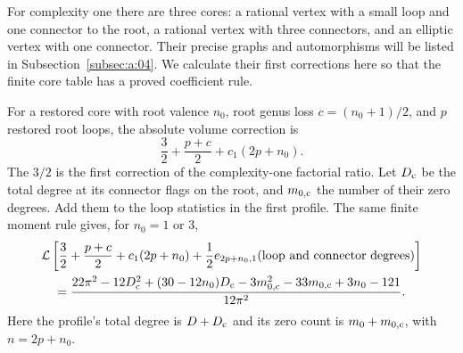 \documentclass[a4paper,10pt]{article}
\numberwithin{equation}{section}
\theoremstyle{paperplain}
\theoremstyle{paperremark}
\theoremstyle{paperplain}
\begin{document}
For complexity one there are three cores: a rational vertex with a
small loop and one connector to the root, a rational vertex with three
connectors, and an elliptic vertex with one connector. Their precise
graphs and automorphisms will be listed in
Subsection~\ref{subsec:a:04}. We calculate their first corrections
here so that the finite core table has a proved coefficient rule.

For a restored core with root valence $n_0$, root genus loss
$c=(n_0+1)/2$, and $p$ restored root loops, the absolute volume
correction is
\[
 \frac32+\frac{p+c}{2}+c_1(2p+n_0).
\]
The $3/2$ is the first correction of the complexity-one factorial
ratio. Let $D_{\rm c}$ be the total degree at its connector flags on
the root, and $m_{0,\rm c}$ the number of their zero degrees. Add them
to the loop statistics in the first profile. The same finite moment
rule gives, for $n_0=1$ or $3$,
\begin{align}
 &\mathcal L\left[\frac32+\frac{p+c}{2}+c_1(2p+n_0)
       +\frac12e_{2p+n_0,1}(\text{loop and connector degrees})\right]
 \notag\\
 &\quad=\frac{22\pi^2-12D_{\rm c}^2+(30-12n_0)D_{\rm c}
      -3m_{0,\rm c}^2-33m_{0,\rm c}+3n_0-121}{12\pi^2}.
 \label{eq:a:q-one-loop-average}
\end{align}
Here the profile's total degree is $D+D_{\rm c}$ and its zero count
is $m_0+m_{0,\rm c}$, with $n=2p+n_0$.
\end{document}
